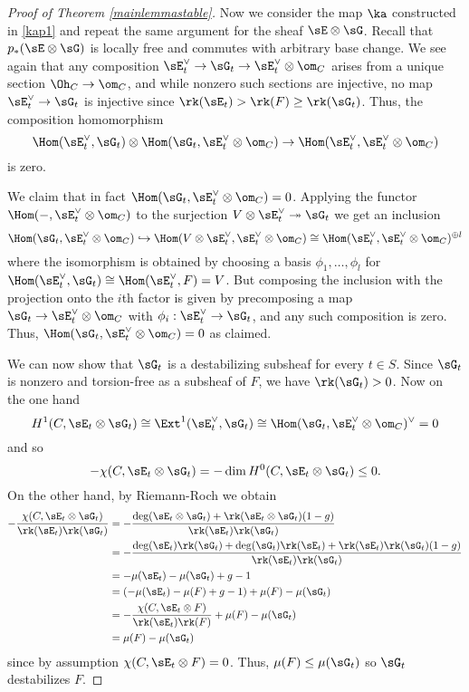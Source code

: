 \begin{proof}[Proof of Theorem \ref{mainlemmastable}]
Now we consider the map $\ka$ constructed in \eqref{kap1} and repeat the same argument for the sheaf $\sE \otimes \sG$. Recall that $p_*(\sE \otimes \sG)$ is locally free and commutes with arbitrary base change. We see again that any composition $\sE_t^\vee \to \sG_t \to \sE_t^\vee \otimes \om_C$ arises from a unique section $\Oh_C \to \om_C$, and while nonzero such sections are injective, no map $\sE_t^\vee \to \sG_t$ is injective since $\rk(\sE_t) > \rk(F) \ge \rk(\sG_t)$. Thus, the composition homomorphism
\[ \Hom(\sE_t^\vee, \sG_t) \otimes \Hom(\sG_t, \sE_t^\vee \otimes \om_C) \to \Hom(\sE_t^\vee, \sE_t^\vee \otimes \om_C) \]
is zero. 

We claim that in fact $\Hom(\sG_t, \sE_t^\vee \otimes \om_C) = 0$. Applying the functor $\Hom(-, \sE_t^\vee \otimes \om_C)$ to the surjection $V \otimes \sE_t^\vee \twoheadrightarrow \sG_t$ we get an inclusion
\[ \Hom(\sG_t, \sE_t^\vee \otimes \om_C) \hookrightarrow \Hom(V \otimes \sE_t^\vee, \sE_t^\vee \otimes \om_C) \cong \Hom(\sE_t^\vee, \sE_t^\vee \otimes \om_C)^{\oplus l} \]
where the isomorphism is obtained by choosing a basis $\phi_1, \ldots, \phi_l$ for $\Hom(\sE_t^\vee, \sG_t) \cong \Hom(\sE_t^\vee, F) = V$. But composing the inclusion with the projection onto the $i$th factor is given by precomposing a map $\sG_t \to \sE_t^\vee \otimes \om_C$ with $\phi_i: \sE_t^\vee \to \sG_t$, and any such composition is zero. Thus, $\Hom(\sG_t, \sE_t^\vee \otimes \om_C) = 0$ as claimed.

We can now show that $\sG_t$ is a destabilizing subsheaf for every $t \in S$. Since $\sG_t$ is nonzero and torsion-free as a subsheaf of $F$, we have $\rk(\sG_t) > 0$. Now on the one hand
\[ H^1(C, \sE_t \otimes \sG_t) \cong \Ext^1(\sE_t^\vee, \sG_t) \cong \Hom(\sG_t, \sE_t^\vee \otimes \om_C)^\vee = 0 \]
and so
\[ -\chi(C, \sE_t \otimes \sG_t) = -\dim H^0(C, \sE_t \otimes \sG_t) \le 0. \]
On the other hand, by Riemann-Roch we obtain
\begin{align*}
    -\frac{\chi(C, \sE_t \otimes \sG_t)}{\rk(\sE_t) \rk(\sG_t)} & = -\frac{\deg(\sE_t \otimes \sG_t) + \rk(\sE_t \otimes \sG_t)(1-g)}{\rk(\sE_t) \rk(\sG_t)} \\
    & = -\frac{\deg(\sE_t)\rk(\sG_t) + \deg(\sG_t)\rk(\sE_t) + \rk(\sE_t)\rk(\sG_t)(1-g)}{\rk(\sE_t) \rk(\sG_t)} \\
    & = -\mu(\sE_t) - \mu(\sG_t) + g - 1 \\
    & = (-\mu(\sE_t) - \mu(F) + g - 1) + \mu(F) - \mu(\sG_t) \\
    & = -\frac{\chi(C, \sE_t \otimes F)}{\rk(\sE_t)\rk(F)} + \mu(F) - \mu(\sG_t) \\
    & = \mu(F) - \mu(\sG_t)
\end{align*}
since by assumption $\chi(C, \sE_t \otimes F) = 0$. Thus, $\mu(F) \le \mu(\sG_t)$ so $\sG_t$ destabilizes $F$.
\end{proof}


